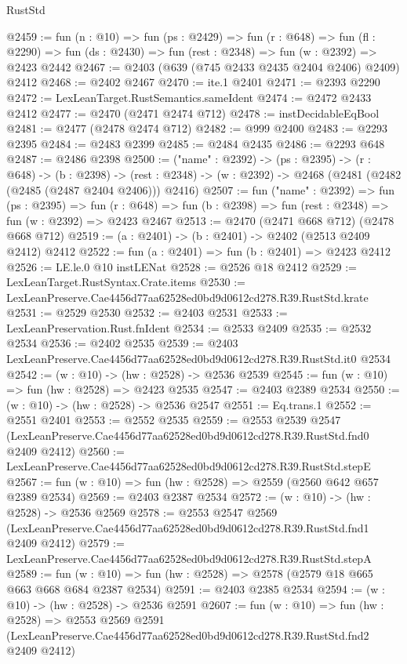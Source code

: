 \begin{lexlean}{RustStd}
\begin{coremodule}
@2459 := fun (n : @10) =>
  fun (ps : @2429) =>
  fun (r : @648) =>
  fun (fl : @2290) => fun (ds : @2430) => fun (rest : @2348) => fun (w : @2392) => @2423 @2442
@2467 := @2403 (@639 (@745 @2433 @2435 @2404 @2406) @2409) @2412
@2468 := @2402 @2467
@2470 := ite.{1} @2401
@2471 := @2393 @2290
@2472 := LexLeanTarget.RustSemantics.sameIdent
@2474 := @2472 @2433 @2412
@2477 := @2470 (@2471 @2474 @712)
@2478 := instDecidableEqBool
@2481 := @2477 (@2478 @2474 @712)
@2482 := @999 @2400
@2483 := @2293 @2395
@2484 := @2483 @2399
@2485 := @2484 @2435
@2486 := @2293 @648
@2487 := @2486 @2398
@2500 := ("name" : @2392) ->
  (ps : @2395) ->
  (r : @648) ->
  (b : @2398) ->
  (rest : @2348) -> (w : @2392) -> @2468 (@2481 (@2482 (@2485 (@2487 @2404 @2406))) @2416)
@2507 := fun ("name" : @2392) =>
  fun (ps : @2395) =>
  fun (r : @648) => fun (b : @2398) => fun (rest : @2348) => fun (w : @2392) => @2423 @2467
@2513 := @2470 (@2471 @668 @712) (@2478 @668 @712)
@2519 := (a : @2401) -> (b : @2401) -> @2402 (@2513 @2409 @2412) @2412
@2522 := fun (a : @2401) => fun (b : @2401) => @2423 @2412
@2526 := LE.le.{0} @10 instLENat
@2528 := @2526 @18 @2412
@2529 := LexLeanTarget.RustSyntax.Crate.items
@2530 := LexLeanPreserve.Cae4456d77aa62528ed0bd9d0612cd278.R39.RustStd.krate
@2531 := @2529 @2530
@2532 := @2403 @2531
@2533 := LexLeanPreservation.Rust.fnIdent
@2534 := @2533 @2409
@2535 := @2532 @2534
@2536 := @2402 @2535
@2539 := @2403 LexLeanPreserve.Cae4456d77aa62528ed0bd9d0612cd278.R39.RustStd.it0 @2534
@2542 := (w : @10) -> (hw : @2528) -> @2536 @2539
@2545 := fun (w : @10) => fun (hw : @2528) => @2423 @2535
@2547 := @2403 @2389 @2534
@2550 := (w : @10) -> (hw : @2528) -> @2536 @2547
@2551 := Eq.trans.{1}
@2552 := @2551 @2401
@2553 := @2552 @2535
@2559 := @2553
    @2539
    @2547
    (LexLeanPreserve.Cae4456d77aa62528ed0bd9d0612cd278.R39.RustStd.fnd0 @2409 @2412)
@2560 := LexLeanPreserve.Cae4456d77aa62528ed0bd9d0612cd278.R39.RustStd.stepE
@2567 := fun (w : @10) => fun (hw : @2528) => @2559 (@2560 @642 @657 @2389 @2534)
@2569 := @2403 @2387 @2534
@2572 := (w : @10) -> (hw : @2528) -> @2536 @2569
@2578 := @2553
    @2547
    @2569
    (LexLeanPreserve.Cae4456d77aa62528ed0bd9d0612cd278.R39.RustStd.fnd1 @2409 @2412)
@2579 := LexLeanPreserve.Cae4456d77aa62528ed0bd9d0612cd278.R39.RustStd.stepA
@2589 := fun (w : @10) => fun (hw : @2528) => @2578 (@2579 @18 @665 @663 @668 @684 @2387 @2534)
@2591 := @2403 @2385 @2534
@2594 := (w : @10) -> (hw : @2528) -> @2536 @2591
@2607 := fun (w : @10) =>
  fun (hw : @2528) =>
  @2553
    @2569
    @2591
    (LexLeanPreserve.Cae4456d77aa62528ed0bd9d0612cd278.R39.RustStd.fnd2 @2409 @2412)

\end{coremodule}
\end{lexlean}
